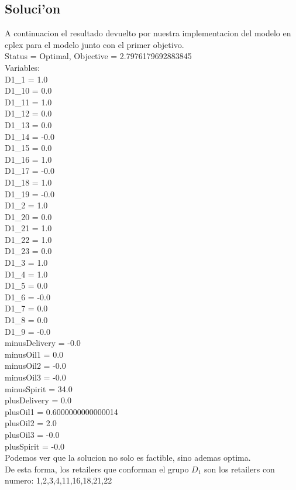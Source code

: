 \subsection{Soluci'on}
A continuacion el resultado devuelto por nuestra implementacion del modelo en cplex para el modelo junto con el primer objetivo.\\
Status = Optimal, Objective = 2.7976179692883845 \\
Variables: \\
D1\_1 = 1.0 \\
D1\_10 = 0.0 \\
D1\_11 = 1.0 \\
D1\_12 = 0.0 \\
D1\_13 = 0.0 \\
D1\_14 = -0.0 \\
D1\_15 = 0.0 \\
D1\_16 = 1.0 \\
D1\_17 = -0.0 \\
D1\_18 = 1.0 \\
D1\_19 = -0.0 \\
D1\_2 = 1.0 \\
D1\_20 = 0.0 \\
D1\_21 = 1.0 \\
D1\_22 = 1.0 \\
D1\_23 = 0.0 \\
D1\_3 = 1.0 \\
D1\_4 = 1.0 \\
D1\_5 = 0.0 \\
D1\_6 = -0.0 \\
D1\_7 = 0.0 \\
D1\_8 = 0.0 \\
D1\_9 = -0.0 \\
minusDelivery = -0.0 \\
minusOil1 = 0.0 \\
minusOil2 = -0.0 \\
minusOil3 = -0.0 \\
minusSpirit = 34.0 \\
plusDelivery = 0.0 \\
plusOil1 = 0.6000000000000014 \\
plusOil2 = 2.0 \\
plusOil3 = -0.0 \\
plusSpirit = -0.0 \\
Podemos ver que la solucion no solo es factible, sino ademas optima.\\
De esta forma, los retailers que conforman el grupo $D_{1}$ son los retailers con numero: 1,2,3,4,11,16,18,21,22\\
